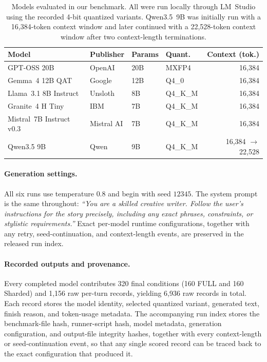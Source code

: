 \begin{table}[t]
\centering
\small
\begin{tabular}{llllr}
\toprule
\textbf{Model} & \textbf{Publisher} & \textbf{Params} & \textbf{Quant.} & \textbf{Context (tok.)} \\
\midrule
GPT-OSS 20B              & OpenAI      & 20B & MXFP4     & 16{,}384 \\
Gemma~4 12B QAT          & Google      & 12B & Q4\_0     & 16{,}384 \\
Llama~3.1 8B Instruct    & Unsloth     & 8B  & Q4\_K\_M  & 16{,}384 \\
Granite~4 H Tiny         & IBM         & 7B  & Q4\_K\_M  & 16{,}384 \\
Mistral~7B Instruct v0.3 & Mistral AI  & 7B  & Q4\_K\_M  & 16{,}384 \\
Qwen3.5 9B               & Qwen        & 9B  & Q4\_K\_M  & 16{,}384 $\rightarrow$ 22{,}528 \\
\bottomrule
\end{tabular}
\caption{Models evaluated in our benchmark. All were run locally through LM~Studio using the recorded 4-bit quantized variants. Qwen3.5~9B was initially run with a 16{,}384-token context window and later continued with a 22{,}528-token context window after two context-length terminations.}
\label{tab:models}
\end{table}

\paragraph{Generation settings.}
All six runs use temperature $0.8$ and begin with seed $12345$. The system prompt is the same throughout: \textit{``You are a skilled creative writer. Follow the user's instructions for the story precisely, including any exact phrases, constraints, or stylistic requirements.''} Exact per-model runtime configurations, together with any retry, seed-continuation, and context-length events, are preserved in the released run index.

\paragraph{Recorded outputs and provenance.} Every completed model contributes 320 final conditions (160 FULL and 160 Sharded) and 1{,}156 raw per-turn records, yielding 6{,}936 raw records in total. Each record stores the model identity, selected quantized variant, generated text, finish reason, and token-usage metadata. The accompanying run index stores the benchmark-file hash, runner-script hash, model metadata, generation configuration, and output-file integrity hashes, together with every context-length or seed-continuation event, so that any single scored record can be traced back to the exact configuration that produced it.

